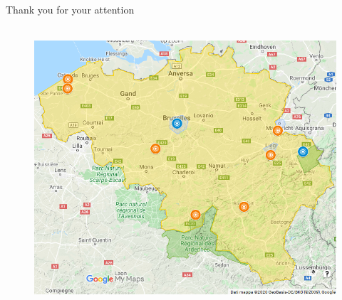 \documentclass{beamer}
\begin{document}
\begin{frame}[plain]
	\centering
	\huge{Thank you for your attention}\\~
	\begin{figure}
		\includegraphics[width=0.7\linewidth]{slides_files/stations-map-smol-2}
	\end{figure}
\end{frame}
	
\end{document}
